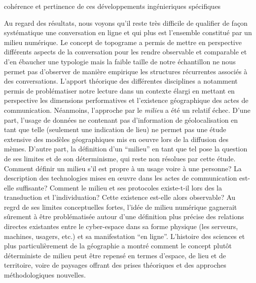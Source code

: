 cohérence et pertinence de ces développements ingénieriques  spécifiques

Au regard des résultats, nous voyons qu{\textquoteright}il reste très difficile de qualifier de fa\c{c}on systématique une conversation en ligne et qui plus est l{\textquoteright}ensemble constitué par un milieu numérique. Le concept de topograme a permis de mettre en perspective différents aspects de la conversation pour les rendre observable et comparable et d{\textquoteright}en ébaucher une typologie mais la faible taille de notre échantillon ne nous permet pas d{\textquoteright}observer de manière empirique les structures récurrentes associés à des conversations. L{\textquoteright}apport théorique des différentes disciplines a notamment permis de problématiser notre lecture dans un contexte élargi en mettant en perspective les dimensions performatives et l{\textquoteright}existence géographique des actes de communication. Néanmoins, l{\textquoteright}approche par le \textit{milieu} a été un relatif échec. D{\textquoteright}une part, l{\textquoteright}usage de données ne contenant pas d{\textquoteright}information de géolocalisation en tant que telle (seulement une indication de lieu) ne permet pas une étude extensive des modèles géographiques mis en oeuvre lors de la diffusion des mèmes. D{\textquoteright}autre part, la définition d{\textquoteright}un {\textquotedblleft}milieu{\textquotedblright} en tant que tel pose la question de ses limites et de son déterminisme, qui reste non résolues par cette étude. Comment définir un milieu s{\textquoteright}il est propre à un usage voire à une personne? La description des technologies mises en {\oe}uvre dans les actes de communication est-elle suffisante? Comment le milieu et ses protocoles existe-t-il lors des la transduction et l{\textquoteright}individuation? Cette existence est-elle alors observable? Au regrd de ses limites conceptuelles fortes, l{\textquoteright}idée de milieu numérique gagnerait s\^urement à \^etre problématisée autour d{\textquoteright}une définition plus précise des relations directes existantes entre le cyber-espace dans sa forme physique (les serveurs, machines, usagers, etc.) et sa manifestation {\textquotedblleft}en ligne{\textquotedblright}. L{\textquoteright}histoire des sciences et plus particulièrement de la géographie a montré comment le concept plut\^ot déterministe de milieu peut \^etre repensé en termes d{\textquoteright}espace, de lieu et de territoire, voire de paysages offrant des prises théoriques et des approches méthodologiques nouvelles.

